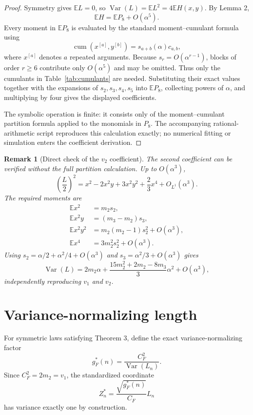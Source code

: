\documentclass[11pt]{article}
\newtheorem{remark}{Remark}
\newcommand{\E}{\mathbb E}
\newcommand{\Var}{\operatorname{Var}}
\newcommand{\cum}{\operatorname{cum}}
\begin{document}
\begin{proof}
Symmetry gives $\E L=0$, so $\Var(L)=\E L^2=4\E H(x,y)$. By Lemma 2,
\begin{equation}
\E H=\E P_8+O(\alpha^5).
\end{equation}
Every moment in $\E P_8$ is evaluated by the standard moment--cumulant formula using
\begin{equation}
\cum(x^{[a]},y^{[b]})=s_{a+b}(\alpha)c_{a,b},
\end{equation}
where $x^{[a]}$ denotes $a$ repeated arguments. Because $s_r=O(\alpha^{r-1})$, blocks of order $r\ge6$ contribute only $O(\alpha^5)$ and may be omitted. Thus only the cumulants in Table~\ref{tab:cumulants} are needed. Substituting their exact values together with the expansions of $s_2,s_3,s_4,s_5$ into $\E P_8$, collecting powers of $\alpha$, and multiplying by four gives the displayed coefficients.

The symbolic operation is finite: it consists only of the moment--cumulant
partition formula applied to the monomials in $P_8$.  The accompanying
rational-arithmetic script reproduces this calculation exactly; no numerical
fitting or simulation enters the coefficient derivation.
\end{proof}

\begin{remark}[Direct check of the $v_2$ coefficient]
The second coefficient can be verified without the full partition calculation. Up to $O(\alpha^3)$,
\begin{equation}
\left(\frac L2\right)^2
=x^2-2x^2y+3x^2y^2+\frac23x^4+O_{L^1}(\alpha^3).
\end{equation}
The required moments are
\begin{align}
\E x^2&=m_2s_2,\\
\E x^2y&=(m_3-m_2)s_3,\\
\E x^2y^2&=m_2(m_2-1)s_2^2+O(\alpha^3),\\
\E x^4&=3m_2^2s_2^2+O(\alpha^3).
\end{align}
Using $s_2=\alpha/2+\alpha^2/4+O(\alpha^3)$ and $s_3=\alpha^2/3+O(\alpha^3)$ gives
\begin{equation}
\Var(L)=2m_2\alpha+\frac{15m_2^2+2m_2-8m_3}{3}\alpha^2+O(\alpha^3),
\end{equation}
independently reproducing $v_1$ and $v_2$.
\end{remark}

\section{Variance-normalizing length}
For symmetric laws satisfying Theorem 3, define the exact variance-normalizing factor
\begin{equation}
\boxed{g_F^*(n)=\frac{C_F^2}{\Var(L_n)}.}
\end{equation}
Since $C_F^2=2m_2=v_1$, the standardized coordinate
\begin{equation}
Z_n^*=\frac{\sqrt{g_F^*(n)}}{C_F}L_n
\end{equation}
has variance exactly one by construction.
\end{document}
